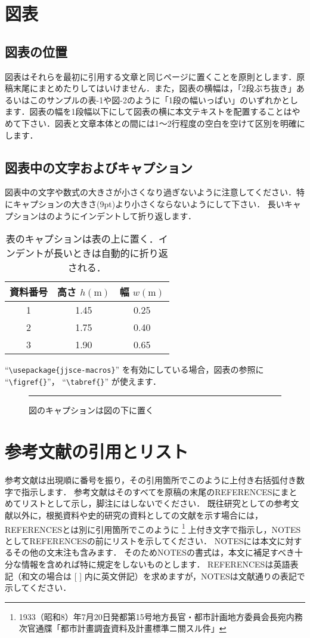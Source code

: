 \documentclass{jjsce}
\begin{document}
\section{図表}
\subsection{図表の位置}
図表はそれらを最初に引用する文章と同じページに置くことを原則とします．原稿末尾にまとめたりしてはいけません．また，図表の横幅は，「2段ぶち抜き」あるいはこのサンプルの表-1や図-2のように「1段の幅いっぱい」のいずれかとします．図表の幅を1段幅以下にして図表の横に本文テキストを配置することはやめて下さい．図表と文章本体との間には1～2行程度の空白を空けて区別を明確にします．

\subsection{図表中の文字およびキャプション}
図表中の文字や数式の大きさが小さくなり過ぎないように注意してください．特にキャプションの大きさ(9pt)より小さくならないようにして下さい．
長いキャプションはのようにインデントして折り返します．


\begin{table}[htb]
\caption{表のキャプションは表の上に置く．インデントが長いときは自動的に折り返される．}
\label{tab:sample}
\centering
\begin{tabular}{|c|c|c|}\hline
資料番号 & 高さ $h(\mathrm{m})$ &幅 $w(\mathrm{m})$ \\\hline
1 & 1.45 & 0.25\\
2 & 1.75 & 0.40\\
3 & 1.90 & 0.65\\\hline
\end{tabular}
\end{table}

``\verb|\usepackage{jjsce-macros}|''
を有効にしている場合，図表の参照に
``\verb|\figref{}|''，
``\verb|\tabref{}|''
が使えます．


\begin{figure}[htb]
\centering
\rule{20mm}{20mm}
\caption{図のキャプションは図の下に置く}
\label{fig:sample}
\end{figure}


\section{参考文献の引用とリスト}

参考文献は出現順に番号を振り，その引用箇所でこのように\cite{a}上付き右括弧付き数字で指示します．
参考文献はそのすべてを原稿の末尾のREFERENCESにまとめてリストとして示し，脚注にはしないでください．
既往研究としての参考文献以外に，根拠資料や史的研究の資料としての文献を示す場合には，REFERENCESとは別に引用箇所でこのように
\footnote{1933（昭和8）年7月20日発都第15号地方長官・都市計画地方委員会長宛内務次官通牒「都市計畫調査資料及計畫標準ニ關スル件」}
上付き文字で指示し，NOTESとしてREFERENCESの前にリストを示してください．
NOTESには本文に対するその他の文末注も含みます．
そのためNOTESの書式は，本文に補足すべき十分な情報を含めれば特に規定をしないものとします．
REFERENCESは英語表記（和文の場合は [ ] 内に英文併記）を求めますが，NOTESは文献通りの表記で示してください．
\end{document}
